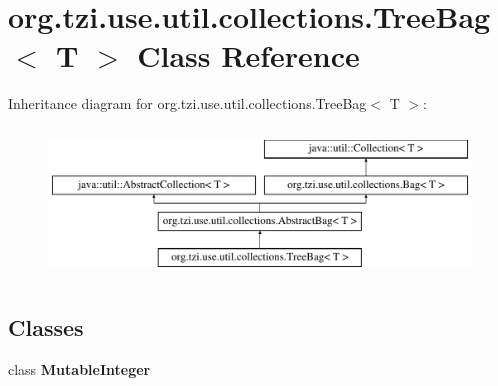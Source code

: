 \hypertarget{classorg_1_1tzi_1_1use_1_1util_1_1collections_1_1_tree_bag_3_01_t_01_4}{\section{org.\-tzi.\-use.\-util.\-collections.\-Tree\-Bag$<$ T $>$ Class Reference}
\label{classorg_1_1tzi_1_1use_1_1util_1_1collections_1_1_tree_bag_3_01_t_01_4}
}
Inheritance diagram for org.\-tzi.\-use.\-util.\-collections.\-Tree\-Bag$<$ T $>$\-:\begin{figure}[H]
\begin{center}
\leavevmode
\includegraphics[height=4.000000cm]{classorg_1_1tzi_1_1use_1_1util_1_1collections_1_1_tree_bag_3_01_t_01_4}
\end{center}
\end{figure}
\subsection*{Classes}
\begin{DoxyCompactItemize}
\item 
class {\bfseries Mutable\-Integer}
\end{DoxyCompactItemize}
